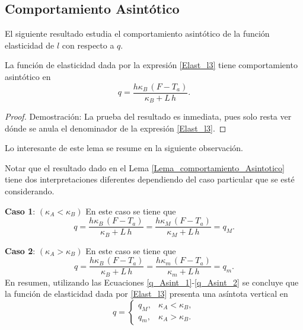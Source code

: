 %
\subsection{Comportamiento Asint\'otico} \label{subsec:Comp_Asintotico}
%
El siguiente resultado estudia el comportamiento asint\'otico de la funci\'on elasticidad de $l$ con respecto a $q$.
%
\begin{lem} \label{Lema_comportamiento_Asintotico}
%
La funci\'on de elasticidad dada por la expresi\'on \eqref{Elast_l3} tiene comportamiento asint\'otico en
%
\begin{equation*}
\label{q_Asint}
q= \dfrac{h \kappa_B \,(F-T_a)}{\kappa_B+L \, h}.
\end{equation*}
%
\end{lem}
%
\begin{proof}{Demostraci\'on:}
%
La prueba del resultado es inmediata, pues solo resta ver d\'onde se anula el denominador de la expresi\'on \eqref{Elast_l3}.
\end{proof}
%
Lo interesante de este lema se resume en la siguiente observaci\'on.
%
\begin{rem}
Notar que el resultado dado en el Lema \ref{Lema_comportamiento_Asintotico} tiene dos interpretaciones diferentes dependiendo del caso particular que se est\'e 
considerando.

\textbf{Caso 1}:  $(\kappa_A < \kappa_B)$
En este caso se tiene que 
%
\begin{equation}
\label{q_Asint_1}
q= \dfrac{h \kappa_B \,(F-T_a)}{\kappa_B+L \, h}=\dfrac{h \kappa_M \,(F-T_a)}{\kappa_M+L \, h}=q_M.
\end{equation}
%

\textbf{Caso 2}:  $(\kappa_A > \kappa_B)$
En este caso se tiene que 
%
\begin{equation}
\label{q_Asint_2}
q= \dfrac{h \kappa_B \,(F-T_a)}{\kappa_B+L \, h}=\dfrac{h \kappa_m \,(F-T_a)}{\kappa_m+L \, h}=q_m.
\end{equation}
%
En resumen, utilizando las Ecuaciones \eqref{q_Asint_1}-\eqref{q_Asint_2} se concluye que la funci\'on de elasticidad dada por \eqref{Elast_l3} presenta una as\'intota vertical en
%
\begin{equation*}
\label{q_Asint_3}
q=
\begin{cases} 
q_M, & \kappa_A < \kappa_B, \\
q_m, & \kappa_A > \kappa_B.
\end{cases}
\end{equation*}
%        
\end{rem}
%
